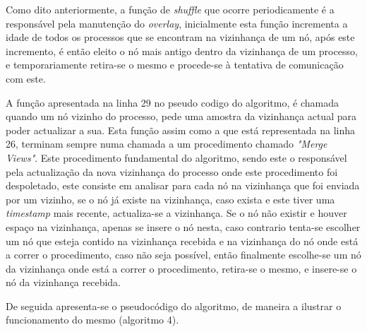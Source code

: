 Como dito anteriormente, a função de \textit{shuffle }que ocorre periodicamente é a responsável pela manutenção do \textit{overlay}, inicialmente esta função incrementa a idade de todos os processos que se encontram na vizinhança de um nó, após este incremento, é então eleito o nó mais antigo dentro da vizinhança de um processo, e temporariamente  retira-se o mesmo e procede-se à tentativa de comunicação com este.

A função apresentada na linha 29 no pseudo codigo do algoritmo, é chamada quando um nó vizinho do processo, pede uma amostra da vizinhança actual para poder actualizar a sua. Esta função assim como a que está representada na linha 26, terminam sempre numa chamada a um procedimento chamado \textit{"Merge Views"}. Este procedimento fundamental do algoritmo, sendo este o responsável pela actualização da nova vizinhança do processo onde este procedimento foi despoletado, este consiste em analisar para cada nó na vizinhança que foi enviada por um vizinho, se o nó já existe na vizinhança, caso exista e este tiver uma \textit{timestamp} mais recente, actualiza-se a vizinhança. Se o nó não existir e houver espaço na vizinhança, apenas se insere o nó nesta, caso contrario tenta-se escolher um nó que esteja contido na vizinhança recebida e na vizinhança do nó onde está a correr o procedimento, caso não seja possível, então finalmente escolhe-se um nó da vizinhança onde está a correr o procedimento, retira-se o mesmo, e insere-se o nó da vizinhança recebida.

De seguida apresenta-se o pseudocódigo do algoritmo, de maneira a ilustrar o funcionamento do mesmo (algoritmo 4).


